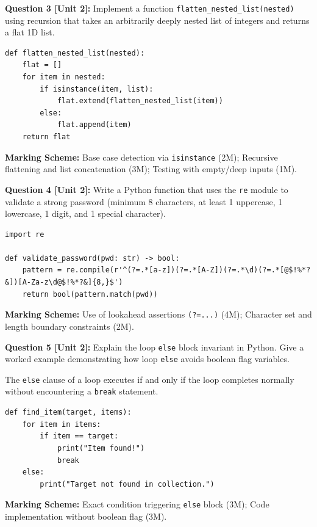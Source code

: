 \noindent\textbf{Question 3 [Unit 2]:} Implement a function \texttt{flatten\_nested\_list(nested)} using recursion that takes an arbitrarily deeply nested list of integers and returns a flat 1D list.
\begin{solutionbox}
\begin{lstlisting}
def flatten_nested_list(nested):
    flat = []
    for item in nested:
        if isinstance(item, list):
            flat.extend(flatten_nested_list(item))
        else:
            flat.append(item)
    return flat
\end{lstlisting}
\end{solutionbox}
\begin{markingrubric}
\textbf{Marking Scheme:} Base case detection via \texttt{isinstance} (2M); Recursive flattening and list concatenation (3M); Testing with empty/deep inputs (1M).
\end{markingrubric}

\noindent\textbf{Question 4 [Unit 2]:} Write a Python function that uses the \texttt{re} module to validate a strong password (minimum 8 characters, at least 1 uppercase, 1 lowercase, 1 digit, and 1 special character).
\begin{solutionbox}
\begin{lstlisting}
import re

def validate_password(pwd: str) -> bool:
    pattern = re.compile(r'^(?=.*[a-z])(?=.*[A-Z])(?=.*\d)(?=.*[@$!%*?&])[A-Za-z\d@$!%*?&]{8,}$')
    return bool(pattern.match(pwd))
\end{lstlisting}
\end{solutionbox}
\begin{markingrubric}
\textbf{Marking Scheme:} Use of lookahead assertions \texttt{(?=...)} (4M); Character set and length boundary constraints (2M).
\end{markingrubric}

\noindent\textbf{Question 5 [Unit 2]:} Explain the loop \texttt{else} block invariant in Python. Give a worked example demonstrating how loop \texttt{else} avoids boolean flag variables.
\begin{solutionbox}
The \texttt{else} clause of a loop executes if and only if the loop completes normally without encountering a \texttt{break} statement.
\begin{lstlisting}
def find_item(target, items):
    for item in items:
        if item == target:
            print("Item found!")
            break
    else:
        print("Target not found in collection.")
\end{lstlisting}
\end{solutionbox}
\begin{markingrubric}
\textbf{Marking Scheme:} Exact condition triggering \texttt{else} block (3M); Code implementation without boolean flag (3M).
\end{markingrubric}

